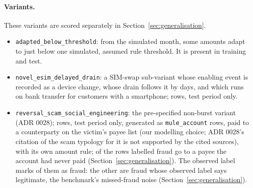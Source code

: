 \paragraph{Variants.} These variants are scored separately in Section~\ref{sec:generalisation}.
\begin{itemize}
    \item \texttt{adapted\_below\_threshold}: from the \nAdaptMonthOrdinal{} simulated month, some amounts
  adapt to just below one simulated, assumed rule threshold. It is present in training and test.
    \item \texttt{novel\_esim\_delayed\_drain}: a SIM-swap sub-variant whose enabling event is
  recorded as a device change, whose drain follows it by days, and which runs on bank transfer for
  customers with a smartphone; \nNovelRows{} rows, test period only.
  \item \texttt{reversal\_scam\_social\_engineering}: the pre-specified non-burst variant
  (ADR 0028); \nRevRows{} rows, test period only, generated as \texttt{mule\_account} rows,
  paid to a counterparty on the victim's payee list (our modelling choice; ADR 0028's citation of
  the scam typology for it is not supported by the cited sources), with its own amount rule; \nRevNovelScored{} of the \nRevFraud{} rows labelled fraud go to a payee the
  account had never paid (Section~\ref{sec:generalisation}). The observed label marks \nRevFraud{} of them as fraud: the
  other \nRevScoredUnlabelled{} are fraud whose observed label says legitimate, the benchmark's
  missed-fraud noise (Section~\ref{sec:generalisation}).
\end{itemize}
